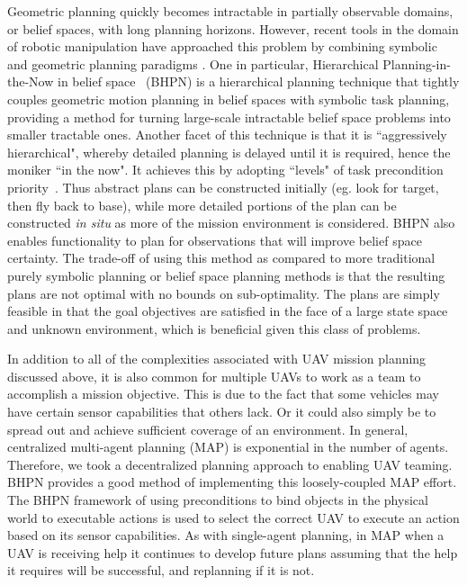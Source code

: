\documentclass[12pt]{article}
\begin{document}
Geometric planning quickly becomes intractable in partially observable domains, or belief spaces\cite{miller2009pomdp, bourgault2003coordinated}, with long planning horizons. However, recent tools in the domain of robotic manipulation have approached this problem by combining symbolic and geometric planning paradigms \cite{kaelbling2010hierarchical, cambon2009hybrid, wolfe2010combined}. One in particular, Hierarchical Planning-in-the-Now in belief space~\cite{kaelbling2012integrated} (BHPN) is a hierarchical planning technique that tightly couples geometric motion planning in belief spaces with symbolic task planning, providing a method for turning large-scale intractable belief space problems into smaller tractable ones. Another facet of this technique is that it is ``aggressively hierarchical", whereby detailed planning is delayed until it is required, hence the moniker ``in the now". It achieves this by adopting ``levels" of task precondition priority~\cite{sacerdoti1974planning}. Thus abstract plans can be constructed initially (eg. look for target, then fly back to base), while more detailed portions of the plan can be constructed \textit{in situ} as more of the mission environment is considered. BHPN also enables functionality to plan for observations that will improve belief space certainty. The trade-off of using this method as compared to more traditional purely symbolic planning or belief space planning methods is that the resulting plans are not optimal with no bounds on sub-optimality. The plans are simply feasible in that the goal objectives are satisfied in the face of a large state space and unknown environment, which is beneficial given this class of problems. 

In addition to all of the complexities associated with UAV mission planning discussed above, it is also common for multiple UAVs to work as a team to accomplish a mission objective. This is due to the fact that some vehicles may have certain sensor capabilities that others lack. Or it could also simply be to spread out and achieve sufficient coverage of an environment. In general, centralized multi-agent planning (MAP) is exponential in the number of agents. Therefore, we took a decentralized planning approach to enabling UAV teaming. BHPN provides a good method of implementing this loosely-coupled MAP effort. The BHPN framework of using preconditions to bind objects in the physical world to executable actions is used to select the correct UAV to execute an action based on its sensor capabilities. As with single-agent planning, in MAP when a UAV is receiving help it continues to develop future plans assuming that the help it requires will be successful, and replanning if it is not.
\end{document}
